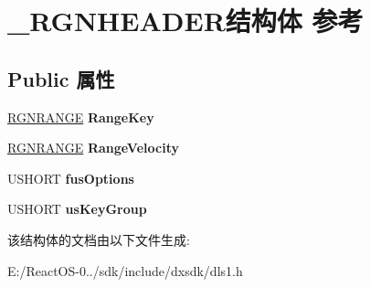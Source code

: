 \hypertarget{struct___r_g_n_h_e_a_d_e_r}{}\section{\+\_\+\+R\+G\+N\+H\+E\+A\+D\+E\+R结构体 参考}
\label{struct___r_g_n_h_e_a_d_e_r}
\subsection*{Public 属性}
\begin{DoxyCompactItemize}
\item 
\mbox{\label{struct___r_g_n_h_e_a_d_e_r_ad667d54c528e06eee3ea80332e9a7c13}} 
\hyperlink{struct___r_g_n_r_a_n_g_e}{R\+G\+N\+R\+A\+N\+GE} {\bfseries Range\+Key}
\item 
\mbox{\label{struct___r_g_n_h_e_a_d_e_r_a0e6e11fde0c148636bd3e965f968fbeb}} 
\hyperlink{struct___r_g_n_r_a_n_g_e}{R\+G\+N\+R\+A\+N\+GE} {\bfseries Range\+Velocity}
\item 
\mbox{\label{struct___r_g_n_h_e_a_d_e_r_a1c966bcee421d4a25a9c85cad25eed9e}} 
U\+S\+H\+O\+RT {\bfseries fus\+Options}
\item 
\mbox{\label{struct___r_g_n_h_e_a_d_e_r_a003b39511a4df8ac5035a0cde5a82716}} 
U\+S\+H\+O\+RT {\bfseries us\+Key\+Group}
\end{DoxyCompactItemize}


该结构体的文档由以下文件生成\+:\begin{DoxyCompactItemize}
\item 
E\+:/\+React\+O\+S-\/0../sdk/include/dxsdk/dls1.\+h\end{DoxyCompactItemize}
